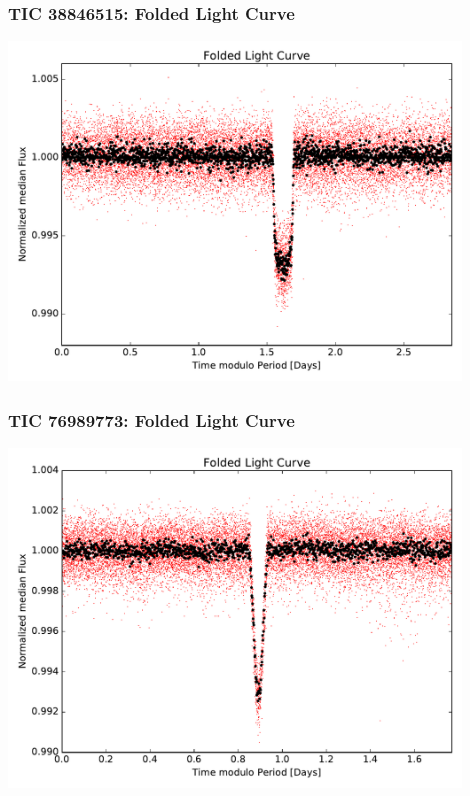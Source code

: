 \documentclass[notes]{beamer}
\begin{document}
\begin{frame}
\frametitle{TIC 38846515: Folded Light Curve}
\centering
\includegraphics[width=0.9\textwidth]{../figures/2019-1-15_16:2:14_Folded_TIC38846515.pdf}
\end{frame}

\begin{frame}
\frametitle{TIC 76989773: Folded Light Curve}
\centering
\includegraphics[width=0.9\textwidth]{../figures/2019-1-15_16:2:14_Folded_TIC76989773.pdf}
\end{frame}
\end{document}

